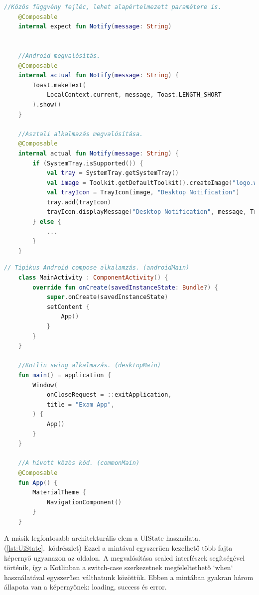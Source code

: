 \begin{lstlisting}[caption={Egyszerűbb példa az expect és actual függvények használatára. Debugolás során használt kódrészlet.}, label={lst:ExpectActualSample}, language=Kotlin]
    //Közös függvény fejléc, lehet alapértelmezett paramétere is.
    @Composable
    internal expect fun Notify(message: String)
    
    
    //Android megvalósítás.
    @Composable
    internal actual fun Notify(message: String) {
        Toast.makeText(
            LocalContext.current, message, Toast.LENGTH_SHORT
        ).show()
    }
    
    //Asztali alkalmazás megvalósítása.
    @Composable
    internal actual fun Notify(message: String) {
        if (SystemTray.isSupported()) {
            val tray = SystemTray.getSystemTray()
            val image = Toolkit.getDefaultToolkit().createImage("logo.webp")
            val trayIcon = TrayIcon(image, "Desktop Notification")
            tray.add(trayIcon)
            trayIcon.displayMessage("Desktop Notification", message, TrayIcon.MessageType.INFO)
        } else {
            ...
        }
    }
\end{lstlisting}

\pagebreak

\begin{lstlisting}[caption={Alkalamzás elindítása}, label={lst:Start}, language=Kotlin]
    // Tipikus Android compose alkalamzás. (androidMain)
    class MainActivity : ComponentActivity() {
        override fun onCreate(savedInstanceState: Bundle?) {
            super.onCreate(savedInstanceState)
            setContent {
                App()
            }
        }
    }
    
    //Kotlin swing alkalmazás. (desktopMain)
    fun main() = application {
        Window(
            onCloseRequest = ::exitApplication,
            title = "Exam App",
        ) {
            App()
        }
    }
    
    //A hívott közös kód. (commonMain)
    @Composable
    fun App() {
        MaterialTheme {
            NavigationComponent()
        }
    }
\end{lstlisting}


A másik legfontosabb architekturális elem a UIState használata. (\ref{lst:UiState}.~kódrészlet)  
Ezzel a mintával egyszerűen kezelhető több fajta képernyő ugyanazon az oldalon.  
A megvalósítása sealed interfészek segítségével történik, így a Kotlinban a switch-case szerkezetnek megfeleltethető `when` használatával egyszerűen válthatunk közöttük.  
Ebben a mintában gyakran három állapota van a képernyőnek: loading, success és error.  

